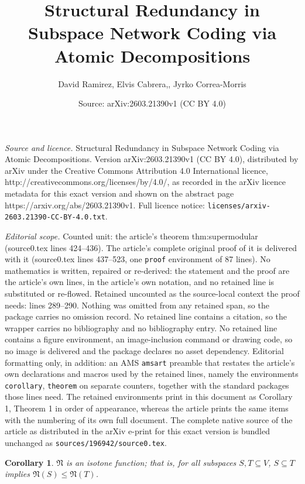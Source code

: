 \documentclass[10pt,a4paper]{amsart}
\title{Structural Redundancy in Subspace Network Coding via Atomic Decompositions}
\author{David Ramirez, Elvis Cabrera,, Jyrko Correa-Morris}
\date{Source: arXiv:2603.21390v1 (CC BY 4.0)}
\newtheorem{corollary}{Corollary}
\begin{document}
\maketitle

\noindent\emph{Source and licence.} Structural Redundancy in Subspace Network Coding via Atomic Decompositions. Version arXiv:2603.21390v1 (CC BY 4.0), distributed by arXiv under the Creative Commons Attribution 4.0 International licence, http://creativecommons.org/licenses/by/4.0/, as recorded in the arXiv licence metadata for this exact version and shown on the abstract page https://arxiv.org/abs/2603.21390v1. Full licence notice: \texttt{licenses/arxiv-2603.21390-CC-BY-4.0.txt}.\par\smallskip

\noindent\textit{Editorial scope.} Counted unit: the article's theorem thm:supermodular (source0.tex lines 424--436). The article's complete original proof of it is delivered with it (source0.tex lines 437--523, one \texttt{proof} environment of 87 lines). No mathematics is written, repaired or re-derived: the statement and the proof are the article's own lines, in the article's own notation, and no retained line is substituted or re-flowed.  Retained uncounted as the source-local context the proof needs: lines 289--290.  Nothing was omitted from any retained span, so the package carries no omission record.  No retained line contains a citation, so the wrapper carries no bibliography and no bibliography entry.  No retained line contains a figure environment, an image-inclusion command or drawing code, so no image is delivered and the package declares no asset dependency.  Editorial formatting only, in addition: an AMS \texttt{amsart} preamble that restates the article's own declarations and macros used by the retained lines, namely the environments \texttt{corollary}, \texttt{theorem} on separate counters, together with the standard packages those lines need.  The retained environments print in this document as Corollary 1, Theorem 1 in order of appearance, whereas the article prints the same items with the numbering of its own full document.  The complete native source of the article as distributed in the arXiv e-print for this exact version is bundled unchanged as \texttt{sources/196942/source0.tex}.
\begin{corollary}\label{Isotonic} $\mathfrak{N}$ is an isotone function; that is, for all subspaces $S,T\subseteq V$, $S\subseteq T$ implies $\mathfrak{N}(S)\le \mathfrak{N}(T)$.
\end{corollary}
\end{document}
